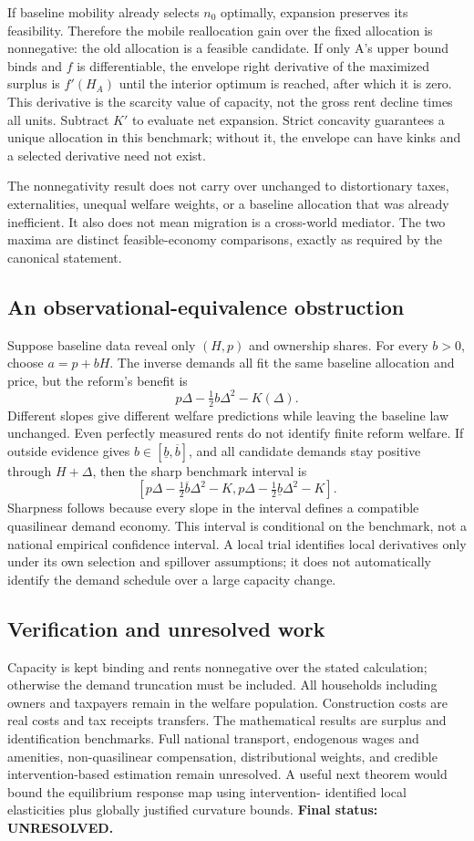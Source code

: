 \documentclass[11pt]{article}
\begin{document}
If baseline mobility already selects $n_0$ optimally, expansion preserves
its feasibility. Therefore the mobile reallocation gain over the fixed
allocation is nonnegative: the old allocation is a feasible candidate.
If only A's upper bound binds and $f$ is differentiable, the envelope
right derivative of the maximized surplus is $f'(H_A)$ until the interior
optimum is reached, after which it is zero. This derivative is the
scarcity value of capacity, not the gross rent decline times all units.
Subtract $K'$ to evaluate net expansion. Strict concavity guarantees a
unique allocation in this benchmark; without it, the envelope can have
kinks and a selected derivative need not exist.

The nonnegativity result does not carry over unchanged to distortionary
taxes, externalities, unequal welfare weights, or a baseline allocation
that was already inefficient. It also does not mean migration is a
cross-world mediator. The two maxima are distinct feasible-economy
comparisons, exactly as required by the canonical statement.

\subsection*{An observational-equivalence obstruction}
Suppose baseline data reveal only $(H,p)$ and ownership shares. For every
$b>0$, choose $a=p+bH$. The inverse demands all fit the same baseline
allocation and price, but the reform's benefit is
\[
 p\Delta-\tfrac12b\Delta^2-K(\Delta).
\]
Different slopes give different welfare predictions while leaving the
baseline law unchanged. Even perfectly measured rents do not identify
finite reform welfare. If outside evidence gives $b\in[\underline b,
\overline b]$, and all candidate demands stay positive through
$H+\Delta$, then the sharp benchmark interval is
\[
 [p\Delta-\tfrac12\overline b\Delta^2-K,
   p\Delta-\tfrac12\underline b\Delta^2-K].
\]
Sharpness follows because every slope in the interval defines a compatible
quasilinear demand economy. This interval is conditional on the benchmark,
not a national empirical confidence interval. A local trial identifies
local derivatives only under its own selection and spillover assumptions;
it does not automatically identify the demand schedule over a large
capacity change.

\subsection*{Verification and unresolved work}
Capacity is kept binding and rents nonnegative over the stated calculation;
otherwise the demand truncation must be included. All households including
owners and taxpayers remain in the welfare population. Construction costs
are real costs and tax receipts transfers. The mathematical results are
surplus and identification benchmarks. Full national transport, endogenous
wages and amenities, non-quasilinear compensation, distributional weights,
and credible intervention-based estimation remain unresolved. A useful
next theorem would bound the equilibrium response map using intervention-
identified local elasticities plus globally justified curvature bounds.
\textbf{Final status: UNRESOLVED.}
\end{document}
